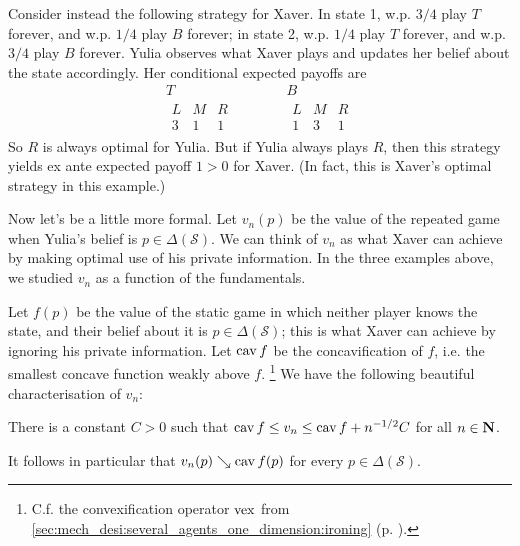 \documentclass[11pt,letterpaper,reqno,oneside]{article}
\begin{document}
\begin{example}
	Consider instead the following strategy for Xaver. In state 1, w.p. $3/4$ play $T$ forever, and w.p. $1/4$ play $B$ forever; in state 2, w.p. $1/4$ play $T$ forever, and w.p. $3/4$ play $B$ forever. Yulia observes what Xaver plays and updates her belief about the state accordingly. Her conditional expected payoffs are
	\begin{equation*}
		\begin{gathered}
			T\\
			\begin{array}{ccc}
				L & M & R \\ \hline
				3 & 1 & 1
			\end{array}
		\end{gathered}
		\quad\quad\quad
		\begin{gathered}
			B\\
			\begin{array}{ccc}
				L & M & R \\ \hline
				1 & 3 & 1
			\end{array}
		\end{gathered}
	\end{equation*}
	So $R$ is always optimal for Yulia. But if Yulia always plays $R$, then this strategy yields ex ante expected payoff $1>0$ for Xaver. (In fact, this is Xaver's optimal strategy in this example.)
\end{example}


Now let's be a little more formal. Let $v_n(p)$ be the value of the repeated game when Yulia's belief is $p \in \Delta(\mathcal{S})$. We can think of $v_n$ as what Xaver can achieve by making optimal use of his private information. In the three examples above, we studied $v_n$ as a function of the fundamentals.


Let $f(p)$ be the value of the static game in which neither player knows the state, and their belief about it is $p \in \Delta(\mathcal{S})$; this is what Xaver can achieve by ignoring his private information. Let $\operatorname*{cav} f$ be the concavification of $f$, i.e. the smallest concave function weakly above $f$.%
	\footnote{C.f. the convexification operator $\operatorname*{vex}$ from \cref{sec:mech_desi:several_agents_one_dimension:ironing} (p. \pageref{sec:mech_desi:several_agents_one_dimension:ironing}).}
We have the following beautiful characterisation of $v_n$:
%
\begin{theorem}
	There is a constant $C > 0$ such that $\operatorname*{cav} f \leq v_n \leq \operatorname*{cav} f + n^{-1/2} C$ for all $n \in \mathbf{N}$.
\end{theorem}
%
\noindent It follows in particular that $v_n(p) \searrow \operatorname*{cav} f(p)$ for every $p \in \Delta(\mathcal{S})$.
\end{document}
